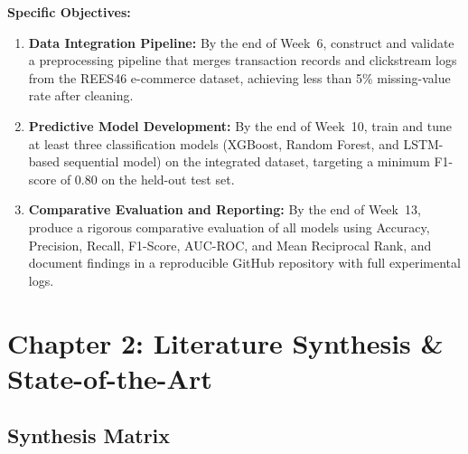 \documentclass[12pt,a4paper]{article}
\begin{document}
\textbf{Specific Objectives:}
\begin{enumerate}[leftmargin=1.5cm]
  \item \textbf{Data Integration Pipeline:} By the end of Week~6, construct and
        validate a preprocessing pipeline that merges transaction records and clickstream
        logs from the REES46 e-commerce dataset, achieving less than 5\% missing-value rate
        after cleaning.

  \item \textbf{Predictive Model Development:} By the end of Week~10, train and tune
        at least three classification models (XGBoost, Random Forest, and LSTM-based
        sequential model) on the integrated dataset, targeting a minimum F1-score of 0.80
        on the held-out test set.

  \item \textbf{Comparative Evaluation and Reporting:} By the end of Week~13, produce
        a rigorous comparative evaluation of all models using Accuracy, Precision, Recall,
        F1-Score, AUC-ROC, and Mean Reciprocal Rank, and document findings in a
        reproducible GitHub repository with full experimental logs.
\end{enumerate}

\section{Chapter 2: Literature Synthesis \& State-of-the-Art}

\subsection{Synthesis Matrix}
\end{document}
